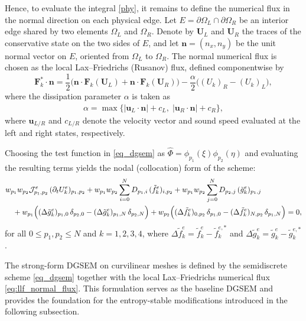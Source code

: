 \documentclass[fleqn,11pt]{amsart}
\begin{document}
Hence, to evaluate the integral \eqref{phy}, it remains to define the numerical
flux in the normal direction on each physical edge.
Let $E = \partial\Omega_L \cap \partial\Omega_R$ be an interior edge shared by
two elements $\Omega_L$ and $\Omega_R$. Denote by $\boldsymbol U_L$ and
$\boldsymbol U_R$ the traces of the conservative state on the two sides of $E$,
and let $\boldsymbol n = (n_x,n_y)$ be the unit normal vector on $E$, oriented
from $\Omega_L$ to $\Omega_R$.
The normal numerical flux is chosen as the local Lax--Friedrichs (Rusanov) flux,
defined componentwise by
\begin{equation}
\label{eq:llf_normal_flux}
\boldsymbol F_k^{*} \cdot \boldsymbol n
=
\frac12\Big(
\boldsymbol n \cdot \boldsymbol F_k(\boldsymbol U_L)
+
\boldsymbol n \cdot \boldsymbol F_k(\boldsymbol U_R)
\Big)
-
\frac{\alpha}{2}\Big(
(U_k)_R - (U_k)_L
\Big),
\end{equation}
where the dissipation parameter $\alpha$ is taken as
\begin{align}
\label{alpha-x}
\alpha
=
\max\bigl\{
|\boldsymbol u_L \cdot \boldsymbol n| + c_L,\;
|\boldsymbol u_R \cdot \boldsymbol n| + c_R
\bigr\},    
\end{align}
where $\boldsymbol u_{L/R}$ and $c_{L/R}$ denote the velocity vector and sound
speed evaluated at the left and right states, respectively.


Choosing the test function in \eqref{eq_dgsem} as
$\hat\Phi=\phi_{p_1}(\xi)\phi_{p_2}(\eta)$ and evaluating the resulting terms yields the nodal (collocation) form of the scheme:
\begin{equation}
\label{eq_dgsem1}
\begin{aligned}
&w_{p_1}w_{p_2}\mathcal{J}_{p_1,p_2}^e\,(\partial_t U_k^e)_{p_1,p_2}
+
w_{p_1}w_{p_2}\sum_{i=0}^N D_{p_1,i}\,(\tilde f_k^e)_{i,p_2}
+
w_{p_1}w_{p_2}\sum_{j=0}^N D_{p_2,j}\,(\tilde g_k^e)_{p_1,j} \\
&\quad
+
w_{p_1}\Bigl(
(\Delta\tilde g_k^e)_{p_1,0}\,\delta_{p_2,0}
-
(\Delta\tilde g_k^e)_{p_1,N}\,\delta_{p_2,N}
\Bigr)
+
w_{p_2}\Bigl(
(\Delta\tilde f_k^e)_{0,p_2}\,\delta_{p_1,0}
-
(\Delta\tilde f_k^e)_{N,p_2}\,\delta_{p_1,N}
\Bigr)
=0,
\end{aligned}
\end{equation}
for all $0\le p_1,p_2\le N$ and $k=1,2,3,4$, where
$\Delta\tilde f_k^e=\tilde f_k^e-\tilde f_k^{e,*}$ and
$\Delta\tilde g_k^e=\tilde g_k^e-\tilde g_k^{e,*}$.


The strong-form DGSEM on curvilinear meshes is defined by the semidiscrete scheme
\eqref{eq_dgsem} together with the local Lax--Friedrichs numerical flux
\eqref{eq:llf_normal_flux}. This formulation serves as the baseline DGSEM and
provides the foundation for the entropy-stable modifications introduced in the
following subsection.
\end{document}

